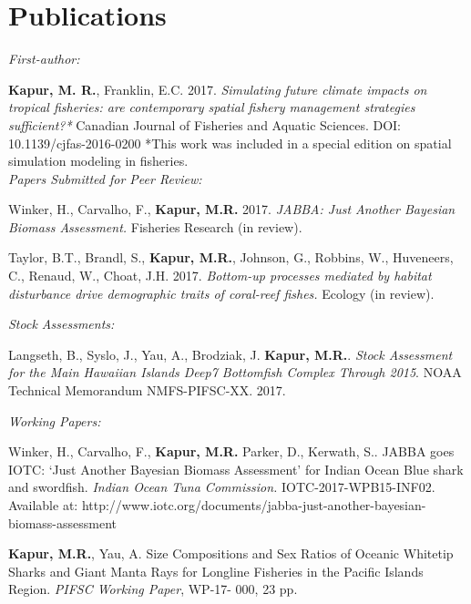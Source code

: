 \documentclass[10pt, letterpaper]{article}
\begin{document}
\section*{Publications}
\noindent \textit{First-author:}

\hangindent=0.5cm \noindent \textbf{Kapur, M. R.}, Franklin, E.C. 2017. \textit{Simulating future climate impacts on tropical fisheries: are contemporary spatial fishery management strategies sufficient?*} Canadian Journal of Fisheries and Aquatic Sciences.  DOI: 10.1139/cjfas-2016-0200 
*This work was included in a special edition on spatial simulation modeling in fisheries. \\

\noindent \textit{Papers Submitted for Peer Review:} 

\hangindent=0.5cm \noindent Winker, H., Carvalho, F., \textbf{Kapur, M.R.} 2017.
\textit{JABBA: Just Another Bayesian Biomass Assessment.} Fisheries Research (in review).\newline

\hangindent=0.5cm \noindent Taylor, B.T., Brandl, S., \textbf{Kapur, M.R.},  Johnson, G., Robbins, W., Huveneers, C., Renaud, W., Choat, J.H. 2017.
\textit{Bottom-up processes mediated by habitat disturbance drive demographic traits of coral-reef fishes.} Ecology (in review).\newline

\newpage

\noindent \textit{Stock Assessments:}

\hangindent=0.5cm \noindent Langseth, B., Syslo, J., Yau, A., Brodziak, J. \textbf{Kapur, M.R.}. \textit{Stock Assessment for the Main Hawaiian Islands Deep7 Bottomfish Complex Through 2015}. NOAA Technical Memorandum NMFS-PIFSC-XX. 2017.  \newline


\noindent \textit{Working Papers:}

\hangindent=0.5cm \noindent Winker, H., Carvalho, F., \textbf{Kapur, M.R.} Parker, D., Kerwath, S.. JABBA goes IOTC: ‘Just Another Bayesian Biomass Assessment’ for Indian Ocean Blue shark and swordfish. \textit{ Indian Ocean Tuna Commission.} IOTC-2017-WPB15-INF02. Available at: http://www.iotc.org/documents/jabba-just-another-bayesian-biomass-assessment \newline

\hangindent=0.5cm \noindent  \textbf{Kapur, M.R.}, Yau, A. Size Compositions and Sex Ratios of Oceanic Whitetip Sharks and Giant Manta Rays for Longline Fisheries in the Pacific Islands Region. \textit{ PIFSC Working Paper}, WP-17- 000, 23 pp.\newline
\end{document}
